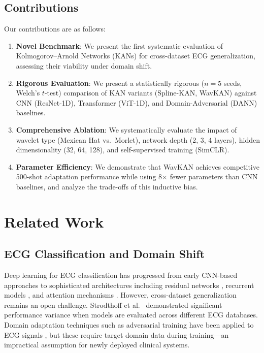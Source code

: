 \documentclass[journal,twoside,web]{ieeecolor}
\begin{document}
\subsection{Contributions}
Our contributions are as follows:

\begin{enumerate}
    \item \textbf{Novel Benchmark}: We present the first systematic evaluation of Kolmogorov--Arnold Networks (KANs) for cross-dataset ECG generalization, assessing their viability under domain shift.
    \item \textbf{Rigorous Evaluation}: We present a statistically rigorous ($n=5$ seeds, Welch's $t$-test) comparison of KAN variants (Spline-KAN, WavKAN) against CNN (ResNet-1D), Transformer (ViT-1D), and Domain-Adversarial (DANN) baselines.
    \item \textbf{Comprehensive Ablation}: We systematically evaluate the impact of wavelet type (Mexican Hat vs.\ Morlet), network depth (2, 3, 4 layers), hidden dimensionality (32, 64, 128), and self-supervised training (SimCLR).
    \item \textbf{Parameter Efficiency}: We demonstrate that WavKAN achieves competitive 500-shot adaptation performance while using 8$\times$ fewer parameters than CNN baselines, and analyze the trade-offs of this inductive bias.
\end{enumerate}

\section{Related Work}

\subsection{ECG Classification and Domain Shift}
Deep learning for ECG classification has progressed from early CNN-based approaches \cite{acharya2017deep} to sophisticated architectures including residual networks \cite{hannun2019cardiologist}, recurrent models \cite{oh2018automated}, and attention mechanisms \cite{yildirim2019new}. However, cross-dataset generalization remains an open challenge. Strodthoff et al.\ \cite{strodthoff2020deep} demonstrated significant performance variance when models are evaluated across different ECG databases. Domain adaptation techniques such as adversarial training \cite{ganin2016domain} have been applied to ECG signals \cite{he2021domain}, but these require target domain data during training---an impractical assumption for newly deployed clinical systems.
\end{document}
